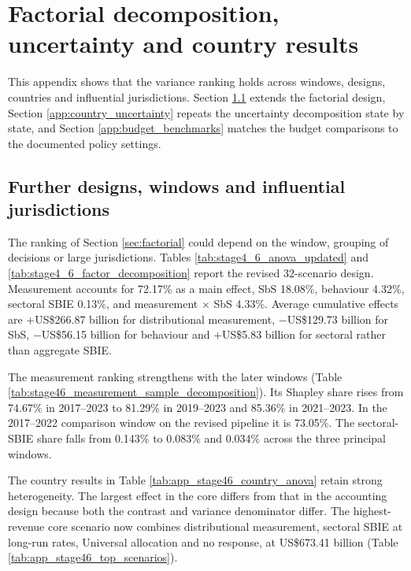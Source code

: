 \documentclass[11pt,a4paper]{article}
\newcommand{\usd}{US\$}
\begin{document}
\clearpage
\section{Factorial decomposition, uncertainty and country results}\label{app:decomposition}

This appendix shows that the variance ranking holds across windows, designs, countries and influential jurisdictions. Section \ref{app:factorial_ext} extends the factorial design, Section \ref{app:country_uncertainty} repeats the uncertainty decomposition state by state, and Section \ref{app:budget_benchmarks} matches the budget comparisons to the documented policy settings.

\subsection{Further designs, windows and influential jurisdictions}\label{app:factorial_ext}

The ranking of Section \ref{sec:factorial} could depend on the window, grouping of decisions or large jurisdictions. Tables \ref{tab:stage4_6_anova_updated} and \ref{tab:stage4_6_factor_decomposition} report the revised 32-scenario design. Measurement accounts for 72.17\% as a main effect, SbS 18.08\%, behaviour 4.32\%, sectoral SBIE 0.13\%, and measurement × SbS 4.33\%. Average cumulative effects are +\usd266.87 billion for distributional measurement, $-$\usd129.73 billion for SbS, $-$\usd56.15 billion for behaviour and +\usd5.83 billion for sectoral rather than aggregate SBIE.





The measurement ranking strengthens with the later windows (Table \ref{tab:stage46_measurement_sample_decomposition}). Its Shapley share rises from 74.67\% in 2017–2023 to 81.29\% in 2019–2023 and 85.36\% in 2021–2023. In the 2017–2022 comparison window on the revised pipeline it is 73.05\%. The sectoral-SBIE share falls from 0.143\% to 0.083\% and 0.034\% across the three principal windows.




The country results in Table \ref{tab:app_stage46_country_anova} retain strong heterogeneity. The largest effect in the core differs from that in the accounting design because both the contrast and variance denominator differ. The highest-revenue core scenario now combines distributional measurement, sectoral SBIE at long-run rates, Universal allocation and no response, at \usd673.41 billion (Table \ref{tab:app_stage46_top_scenarios}).
\end{document}

